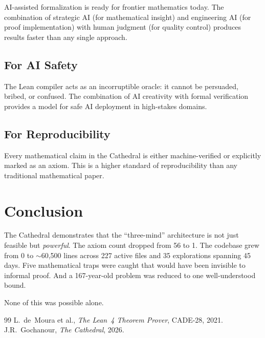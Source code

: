 \documentclass[11pt,a4paper]{article}
\begin{document}
AI-assisted formalization is ready for frontier mathematics today.
The combination of strategic AI (for mathematical insight) and
engineering AI (for proof implementation) with human judgment
(for quality control) produces results faster than any single
approach.

\subsection{For AI Safety}

The Lean compiler acts as an incorruptible oracle: it cannot be
persuaded, bribed, or confused. The combination of AI creativity
with formal verification provides a model for safe AI deployment
in high-stakes domains.

\subsection{For Reproducibility}

Every mathematical claim in the Cathedral is either machine-verified
or explicitly marked as an axiom. This is a higher standard of
reproducibility than any traditional mathematical paper.

\section{Conclusion}

The Cathedral demonstrates that the ``three-mind'' architecture is
not just feasible but \emph{powerful}. The axiom count dropped from
56 to 1. The codebase grew from 0 to $\sim$60{,}500 lines across 227
active files and 35 explorations spanning 45 days. Five mathematical
traps were caught that would have been invisible to informal proof.
And a 167-year-old problem was reduced to one well-understood bound.

None of this was possible alone.

\begin{thebibliography}{99}
L.~de~Moura et al., \emph{The Lean~4 Theorem Prover}, CADE-28, 2021.
J.R.~Gochanour, \emph{The Cathedral}, 2026.
\end{thebibliography}
\end{document}
